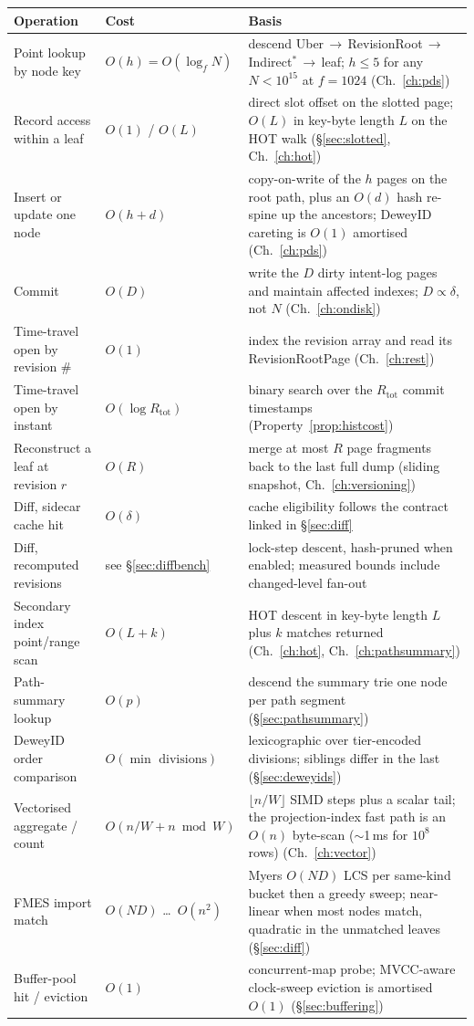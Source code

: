 \documentclass[11pt,a4paper,oneside]{report}
\theoremstyle{sirixthm}
\begin{document}
{\small
\begin{xltabular}{\linewidth}{@{}>{\RaggedRight\arraybackslash}p{0.235\textwidth} >{\RaggedRight\arraybackslash}p{0.18\textwidth} >{\RaggedRight\arraybackslash}X@{}}
\toprule
\textbf{Operation} & \textbf{Cost} & \textbf{Basis}\\
\midrule
\endhead
Point lookup by node key & $O(h)=O(\log_f N)$ & descend Uber\,$\to$\,RevisionRoot\,$\to$\,Indirect$^\ast$\,$\to$\,leaf; $h\le 5$ for any $N<10^{15}$ at $f{=}1024$ (Ch.~\ref{ch:pds})\\
Record access within a leaf & $O(1)$ / $O(L)$ & direct slot offset on the slotted page; $O(L)$ in key-byte length $L$ on the HOT walk (\S\ref{sec:slotted}, Ch.~\ref{ch:hot})\\
Insert or update one node & $O(h+d)$ & copy-on-write of the $h$ pages on the root path, plus an $O(d)$ hash re-spine up the ancestors; DeweyID careting is $O(1)$ amortised (Ch.~\ref{ch:pds})\\
Commit & $O(D)$ & write the $D$ dirty intent-log pages and maintain affected indexes; $D\propto\delta$, not $N$ (Ch.~\ref{ch:ondisk})\\
Time-travel open by revision \# & $O(1)$ & index the revision array and read its RevisionRootPage (Ch.~\ref{ch:rest})\\
Time-travel open by instant & $O(\log R_{\text{tot}})$ & binary search over the $R_{\text{tot}}$ commit timestamps (Property~\ref{prop:histcost})\\
Reconstruct a leaf at revision $r$ & $O(R)$ & merge at most $R$ page fragments back to the last full dump (sliding snapshot, Ch.~\ref{ch:versioning})\\
Diff, sidecar cache hit & $O(\delta)$ & cache eligibility follows the contract linked in \S\ref{sec:diff}\\
Diff, recomputed revisions & see \S\ref{sec:diffbench} & lock-step descent, hash-pruned when enabled; measured bounds include changed-level fan-out\\
Secondary index point/range scan & $O(L+k)$ & HOT descent in key-byte length $L$ plus $k$ matches returned (Ch.~\ref{ch:hot}, Ch.~\ref{ch:pathsummary})\\
Path-summary lookup & $O(p)$ & descend the summary trie one node per path segment (\S\ref{sec:pathsummary})\\
DeweyID order comparison & $O(\min\text{ divisions})$ & lexicographic over tier-encoded divisions; siblings differ in the last (\S\ref{sec:deweyids})\\
Vectorised aggregate / count & $O(n/W + n\bmod W)$ & $\lfloor n/W\rfloor$ SIMD steps plus a scalar tail; the projection-index fast path is an $O(n)$ byte-scan ($\sim$1\,ms for $10^8$ rows) (Ch.~\ref{ch:vector})\\
FMES import match & $O(ND)$ \dots\ $O(n^2)$ & Myers $O(ND)$ LCS per same-kind bucket then a greedy sweep; near-linear when most nodes match, quadratic in the unmatched leaves (\S\ref{sec:diff})\\
Buffer-pool hit / eviction & $O(1)$ & concurrent-map probe; MVCC-aware clock-sweep eviction is amortised $O(1)$ (\S\ref{sec:buffering})\\
\bottomrule
\end{xltabular}}
\end{document}
